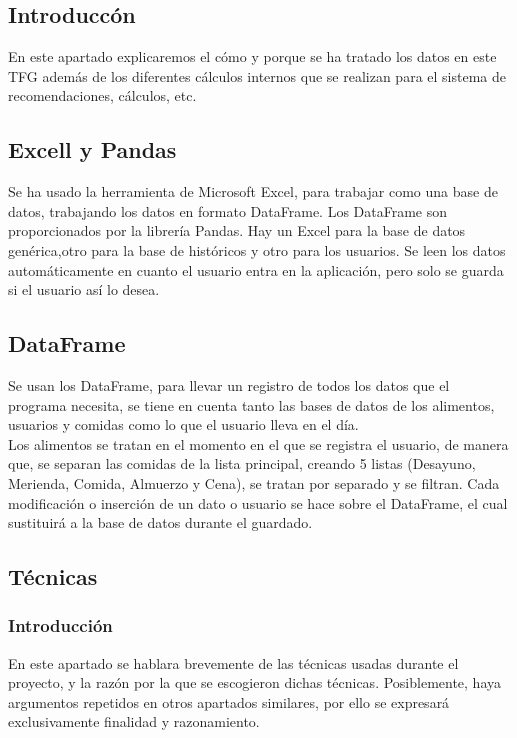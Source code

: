\subsection{Introduccón}
En este apartado explicaremos el cómo y porque se ha tratado los datos en este TFG además de los diferentes cálculos internos que se realizan para el sistema de recomendaciones, cálculos, etc.
\subsection{Excell y Pandas}
Se ha usado la herramienta de Microsoft Excel, para trabajar como una base de datos, trabajando los datos en formato DataFrame. Los DataFrame son proporcionados por la librería Pandas. Hay un Excel para la base de datos genérica,otro para la base de históricos y otro para los usuarios. Se leen los datos automáticamente en cuanto el usuario entra en la aplicación, pero solo se guarda si el usuario así lo desea.
\subsection{DataFrame}
Se usan los DataFrame, para llevar un registro de todos los datos que el programa necesita, se tiene en cuenta tanto las bases de datos de los alimentos, usuarios y comidas como lo que el usuario lleva en el día.
\\
Los alimentos se tratan en el momento en el que se registra el usuario, de manera que, se separan las comidas de la lista principal, creando 5 listas (Desayuno, Merienda, Comida, Almuerzo y Cena), se tratan por separado y se filtran. Cada modificación o inserción de un dato o usuario se hace sobre el DataFrame, el cual sustituirá a la base de datos durante el guardado.

\subsection{Técnicas}
\subsubsection{Introducción}
En este apartado se hablara brevemente de las técnicas usadas durante el proyecto, y la razón por la que se escogieron dichas técnicas. Posiblemente, haya argumentos repetidos en otros apartados similares, por ello se expresará exclusivamente finalidad y razonamiento.
